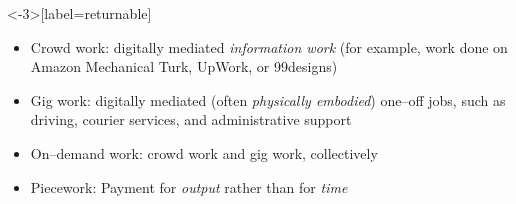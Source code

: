\documentclass[presentation]{subfiles}
\begin{document}

\begin{frame}<-3>[label=returnable]{}
      \begin{itemize}
        \item<1-> \alert{Crowd work}: digitally mediated \emph{information work}
        (for example, work done on Amazon Mechanical Turk, UpWork, or 99designs)\\
          \scriptsize{\textcite{crowdworkFuture}}
        \item<2-> \alert{Gig work}: digitally mediated (often \emph{physically embodied}) one--off jobs,
        such as
        {driving},
        {courier services},
        and {administrative support}\\
          \scriptsize{\textcite{friedman2014workers,Parigi:2016:GE:3026779.3013496}}
        \item<3-> \alert{On--demand work}: crowd work and gig work, collectively
        \item<5-> \alert{Piecework}: Payment for \emph{output} rather than for \emph{time}
      \end{itemize}
\end{frame}
\end{document}
